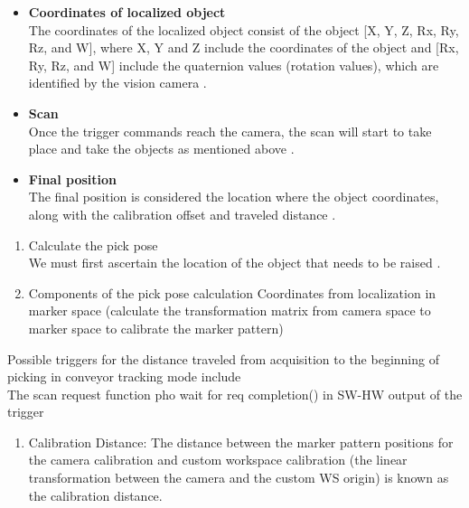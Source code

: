 \documentclass[12pt]{article}
\begin{document}
\begin{itemize}
\item \textbf{Coordinates of localized object}\\
The coordinates of the localized object consist of the object [X, Y, Z, Rx, Ry, Rz, and W], where X, Y and Z include the coordinates of the object and [Rx, Ry, Rz, and W] include the quaternion values (rotation values), which are identified by the vision camera \cite{ref21}.

\item \textbf{ Scan}\\
Once the trigger commands reach the camera, the scan will start to take place and take the objects as mentioned above \cite{ref21}.
\item \textbf{Final position} \\ 
The final position is considered the location where the object coordinates, along with the calibration offset and traveled distance \cite{ref21}.
\end{itemize}

\begin{enumerate}
\item {Calculate the pick pose} \\
We must first ascertain the location of the object that needs to be raised \cite{ref21}.

\item {Components of the pick pose calculation}
 Coordinates from localization in marker space (calculate the transformation matrix from camera space to marker space to calibrate the marker pattern)\cite{ref21}

\end{enumerate}
Possible triggers for the distance traveled from acquisition to the beginning of picking in conveyor tracking mode include\\

The scan request function pho wait for req completion() in SW-HW output of the trigger \\

\begin{enumerate}
\item{Calibration Distance:}
The distance between the marker pattern positions for the camera calibration and custom workspace calibration (the linear transformation between the camera and the custom WS origin) is known as the calibration distance\cite{ref21}.\\
\end{enumerate}
\end{document}
